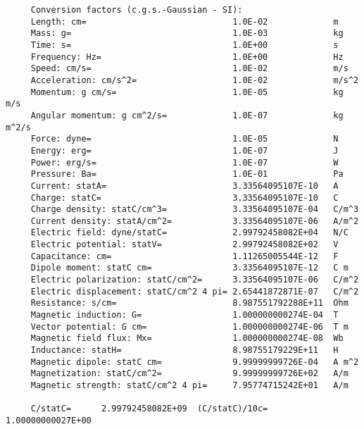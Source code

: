 \documentclass[12pt,a4paper]{article}
\begin{document}
\begin{verbatim}
     Conversion factors (c.g.s.-Gaussian - SI):
     Length: cm=                             1.0E-02             m
     Mass: g=                                1.0E-03             kg
     Time: s=                                1.0E+00             s
     Frequency: Hz=                          1.0E+00             Hz
     Speed: cm/s=                            1.0E-02             m/s
     Acceleration: cm/s^2=                   1.0E-02             m/s^2
     Momentum: g cm/s=                       1.0E-05             kg m/s
     Angular momentum: g cm^2/s=             1.0E-07             kg m^2/s
     Force: dyne=                            1.0E-05             N
     Energy: erg=                            1.0E-07             J
     Power: erg/s=                           1.0E-07             W
     Pressure: Ba=                           1.0E-01             Pa
     Current: statA=                         3.33564095107E-10   A
     Charge: statC=                          3.33564095107E-10   C
     Charge density: statC/cm^3=             3.33564095107E-04   C/m^3
     Current density: statA/cm^2=            3.33564095107E-06   A/m^2
     Electric field: dyne/statC=             2.99792458082E+04   N/C
     Electric potential: statV=              2.99792458082E+02   V
     Capacitance: cm=                        1.11265005544E-12   F
     Dipole moment: statC cm=                3.33564095107E-12   C m
     Electric polarization: statC/cm^2=      3.33564095107E-06   C/m^2
     Electric displacement: statC/cm^2 4 pi= 2.65441872871E-07   C/m^2
     Resistance: s/cm=                       8.987551792288E+11  Ohm
     Magnetic induction: G=                  1.000000000274E-04  T
     Vector potential: G cm=                 1.000000000274E-06  T m
     Magnetic field flux: Mx=                1.000000000274E-08  Wb
     Inductance: statH=                      8.98755179229E+11   H
     Magnetic dipole: statC cm=              9.99999999726E-04   A m^2
     Magnetization: statC/cm^2=              9.99999999726E+02   A/m
     Magnetic strength: statC/cm^2 4 pi=     7.95774715242E+01   A/m

     C/statC=      2.99792458082E+09  (C/statC)/10c=   1.00000000027E+00


\end{verbatim}
\end{document}
